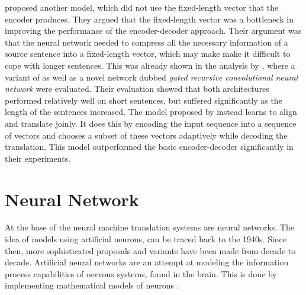 \citep{bahdanau2014neural} proposed another model, which did not use the fixed-length vector that the encoder produces. They argued that the fixed-length vector was a bottleneck in improving the performance of the encoder-decoder approach. Their argument was that the neural network needed to compress all the necessary information of a source sentence into a fixed-length vector, which may make make it difficult to cope with longer sentences. This was already shown in the analysis by \citep{cho2014properties}, where a variant of \citep{cho2014learning} as well as a novel network dubbed \textit{gated recursive convolutional neural network} were evaluated. Their evaluation showed that both architectures performed relatively well on short sentences, but suffered significantly as the length of the sentences increased. The model proposed by \citep{bahdanau2014neural} instead learns to align and translate joinly. It does this by encoding the input sequence into a sequence of vectors and chooses a subset of these vectors adaptively while decoding the translation. This model outperformed the basic encoder-decoder significantly in their experiments.

\section{Neural Network}
At the base of the neural machine translation systems are neural networks. The idea of models using artificial neurons, can be traced back to the 1940s. Since then, more sophisticated proposals and variants have been made from decade to decade. Artificial neural networks are an attempt at modeling the information process capabilities of nervous systems, found in the brain. This is done by implementing mathematical models of neurons \citep{russell2010aimodernapproach}.

